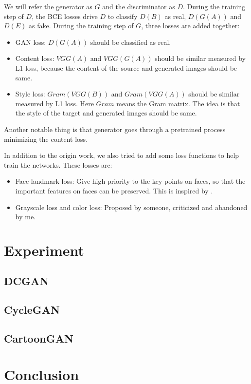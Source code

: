 \documentclass[10pt,twocolumn,letterpaper]{article}
\begin{document}
We will refer the generator as $G$ and the discriminator as $D$. During the
training step of $D$, the BCE losses drive $D$ to classify $D(B)$ as real,
$D(G(A))$ and $D(E)$ as fake. During the training step of $G$, three losses are
added together:
\begin{itemize}[noitemsep, topsep=0pt]
   \item GAN loss: $D(G(A))$ should be classified as real.
   \item Content loss: $VGG(A)$ and $VGG(G(A))$ should be similar measured by L1
   loss, because the content of the source and generated images should be same.
   \item Style loss: $Gram(VGG(B))$ and $Gram(VGG(A))$ should be similar
   measured by L1 loss. Here $Gram$ means the Gram matrix. The idea is that the
   style of the target and generated images should be same.
\end{itemize}
Another notable thing is that generator goes through a pretrained process
minimizing the content loss.

In addition to the origin work, we also tried to add some loss functions to help
train the networks. These losses are:
\begin{itemize}[noitemsep, topsep=0pt]
   \item Face landmark loss: Give high priority to the key points on faces, so
   that the important features on faces can be preserved.
   This is inspired by \cite{wu2019landmark}.
   \item Grayscale loss and color loss: Proposed by someone, criticized and
   abandoned by me.
\end{itemize}

\section{Experiment}

\subsection{DCGAN}

\subsection{CycleGAN}

\subsection{CartoonGAN}

\section{Conclusion}

{\small


}
\end{document}
